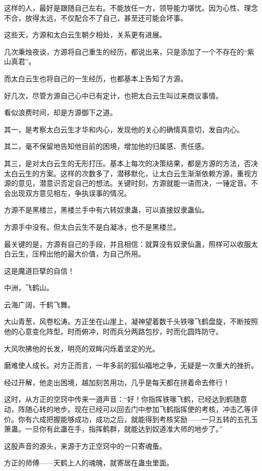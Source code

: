 \begin{this_body}
这样的人，最好是跟随自己左右。不能放任一方，领导能力堪忧。因为心性、理念不合，放得太远，不仅配合不了自己，甚至还可能会坏事。

这些天，方源和太白云生朝夕相处，关系更有进展。

几次秉烛夜谈，方源将自己重生的经历，都说出来，只是添加了一个不存在的“紫山真君”。

而太白云生也将自己的一生经历，也都基本上告知了方源。

好几次，尽管方源自己心中已有定计，也把太白云生叫过来商议事情。

看似浪费时间，却是方源御下之道。

其一，是考察太白云生才华和内心，发现他的关心的确情真意切，发自内心。

其二，毫不保留地告知他目前的困境，增加他的归属感、责任感。

其三，是对太白云生的无形打压。基本上每次的决策结果，都是方源的方法，否决太白云生的方案。这样的次数多了，潜移默化，让太白云生渐渐依赖方源，重视方源的意见，潜意识否定自己的想法。关键时刻，方源就能一语而决，一锤定音。不会出现双方意见相左，争执误事的情况。

方源不是黑楼兰，黑楼兰手中有六转奴隶蛊，可以直接奴隶蛊仙。

方源手中没有。但太白云生不是白凝冰，也不是黑楼兰。

最关键的是，方源有自己的手段，并且相信：就算没有奴隶仙蛊，照样可以收服太白云生，压榨出他的最大价值，为自己所用。

这是魔道巨擘的自信！

中洲，飞鹤山。

云海广阔，千鹤飞舞。

大山青葱，风卷松涛。方正坐在山崖上，凝神望着数千头铁喙飞鹤盘旋，不断按照他的心意变化阵型。时而俯冲，时而兵分两路包抄，时而化圆阵防守。

大风吹拂他的长发，明亮的双眸闪烁着坚定的光。

磨难使人成长。对方正而言，一年多前的狐仙福地之争，无疑是一次重大的挫折。

经过开解，他走出困境，越加刻苦用功，几乎是每天都在拼着命去修行！

这时，从方正的空窍中传来一道声音：“好！你指挥铁喙飞鹤，已经达到鹤随意动，阵随心转的地步。现在已经可以回去门中参加飞鹤指挥使的考核，冲击乙等评价。你有六成把握能够成功，成功之后，就能得到考核奖励——一只五转的五孔玉箫蛊。一旦你有此蛊在手，指挥鹤群，就能达到奴道准大师的地步了。”

这股声音的源头，来源于方正空窍中的一只寄魂蚤。

方正的师傅——天鹤上人的魂魄，就寄居在蛊虫里面。


\end{this_body}
